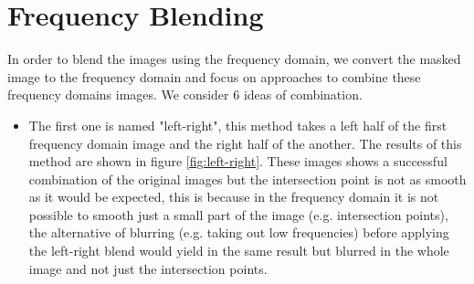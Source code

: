 \section{Frequency Blending}

In order to blend the images using the frequency domain, we convert the masked image to the frequency domain and focus on approaches to combine these frequency domains images. We consider 6 ideas of combination. 

\begin{itemize}
\item The first one	 is named "left-right", this method takes a left half of the first frequency domain image and the right half of the another. The results of this method are shown in figure \ref{fig:left-right}. These images shows a successful combination of the original images but the intersection point is not as smooth as it would be expected, this is because in the frequency domain it is not possible to smooth just a small part of the image (e.g. intersection points), the alternative of blurring (e.g. taking out low frequencies) before applying the left-right blend would yield in the same result but blurred in the whole image and not just the intersection points.


\end{itemize}
